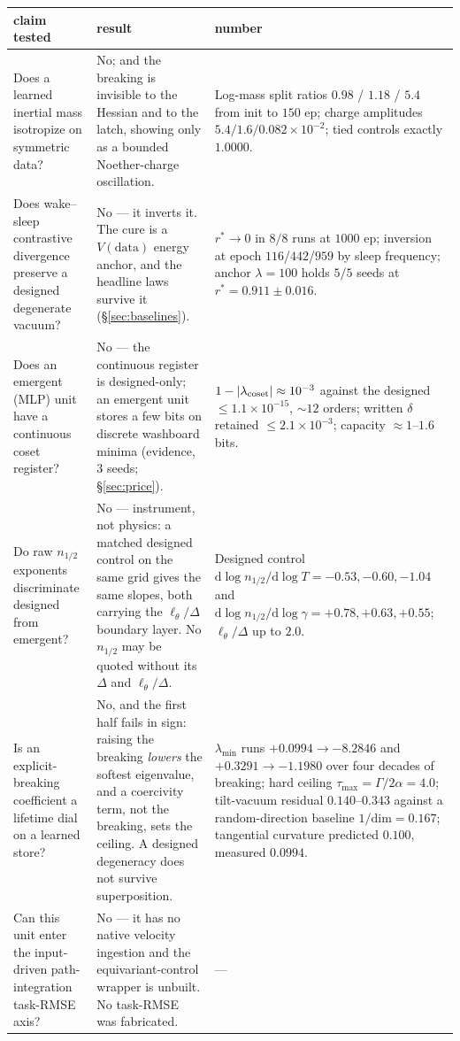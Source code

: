\documentclass{article}
\begin{document}
\begin{center}\scriptsize
\begin{tabular}{@{}p{1.52in} p{1.52in} p{2.06in}@{}}
\toprule
claim tested & result & number \\
\midrule
Does a learned inertial mass isotropize on symmetric data? &
No; and the breaking is invisible to the Hessian and to the latch, showing only as a bounded Noether-charge oscillation.   &
Log-mass split ratios $0.98$ / $1.18$ / $5.4$ from init to $150$ ep; charge amplitudes $5.4/1.6/0.082{\times}10^{-2}$; tied controls exactly $1.0000$. \\[2pt]
Does wake--sleep contrastive divergence preserve a designed degenerate vacuum? &
No --- it inverts it. The cure is a $V(\text{data})$ energy anchor, and the headline laws survive it (\S\ref{sec:baselines}). &
$r^*\to0$ in $8/8$ runs at $1000$ ep; inversion at epoch $116$/$442$/$959$ by sleep frequency; anchor $\lambda{=}100$ holds $5/5$ seeds at $r^*{=}0.911\pm0.016$. \\[2pt]
Does an emergent (MLP) unit have a continuous coset register? &
No --- the continuous register is designed-only; an emergent unit stores a few bits on discrete washboard minima (evidence, $3$ seeds; \S\ref{sec:price}). &
$1-|\lambda_{\rm coset}|\approx10^{-3}$ against the designed $\le1.1{\times}10^{-15}$, $\sim\!12$ orders; written $\delta$ retained $\le2.1{\times}10^{-3}$; capacity $\approx1$--$1.6$ bits. \\[2pt]
Do raw $n_{1/2}$ exponents discriminate designed from emergent? &
No --- instrument, not physics: a matched designed control on the same grid gives the same slopes, both carrying the $\ell_\theta/\Delta$ boundary layer. No $n_{1/2}$ may be quoted without its $\Delta$ and $\ell_\theta/\Delta$. &
Designed control $\mathrm{d}\log n_{1/2}/\mathrm{d}\log T=-0.53,-0.60,-1.04$ and $\mathrm{d}\log n_{1/2}/\mathrm{d}\log\gamma=+0.78,+0.63,+0.55$; $\ell_\theta/\Delta$ up to $2.0$. \\[2pt]
Is an explicit-breaking coefficient a lifetime dial on a learned store? &
No, and the first half fails in sign: raising the breaking \emph{lowers} the softest eigenvalue, and a coercivity term, not the breaking, sets the ceiling. A designed degeneracy does not survive superposition. &
$\lambda_{\min}$ runs $+0.0994\to-8.2846$ and $+0.3291\to-1.1980$ over four decades of breaking; hard ceiling $\tau_{\max}=\Gamma/2\alpha=4.0$; tilt-vacuum residual $0.140$--$0.343$ against a random-direction baseline $1/\mathrm{dim}=0.167$; tangential curvature predicted $0.100$, measured $0.0994$. \\[2pt]
Can this unit enter the input-driven path-integration task-RMSE axis? &
No --- it has no native velocity ingestion and the equivariant-control wrapper is unbuilt. No task-RMSE was fabricated. &
--- \\[2pt]
\bottomrule
\end{tabular}
\end{center}
\end{document}
